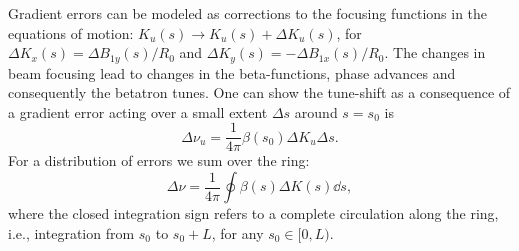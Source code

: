 
    Gradient errors can be modeled as corrections to the focusing functions in the equations of motion: $K_u(s)\to K_u(s) + \Delta K_u(s)$, for $\Delta K_x(s) = \Delta B_{1y}(s)/R_0$ and $\Delta K_y(s) = -\Delta B_{1x}(s)/R_0$. The changes in beam focusing lead to changes in the beta-functions, phase advances and consequently the betatron tunes. One can show the tune-shift as a consequence of a gradient error acting over a small extent $\Delta s$ around $s=s_0$ is \cite{lee_accelerator_2004}
         \begin{equation}
        \Delta \nu_u = \frac{1}{4\pi} \beta(s_0) \Delta K_u \Delta s.
        \label{eq:delta_nu}
     \end{equation}
     For a distribution of errors we sum over the ring:
     \begin{equation}
        \Delta \nu = \frac{1}{4\pi}\oint \beta(s) \Delta K(s) \dd s,
        \label{eq:delta_nu_dist}
    \end{equation}
    where the closed integration sign refers to a complete circulation along the ring, i.e., integration from $s_0$ to $s_0+L$, for any $s_0\in[0,L)$.

